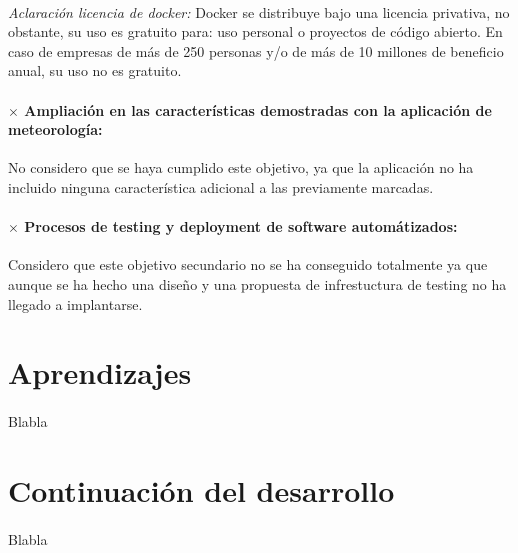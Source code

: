 \paragraph{}
\emph{Aclaración licencia de docker:} Docker se distribuye bajo una licencia privativa,
no obstante, su uso es gratuito para: uso personal o proyectos de código abierto. En
caso de empresas de más de 250 personas y/o de más de 10 millones de beneficio anual,
su uso no es gratuito.

\paragraph{$\times$ Ampliación en las características demostradas con la aplicación de
meteorología:} No considero que se haya cumplido este objetivo, ya que la aplicación
no ha incluido ninguna característica adicional a las previamente marcadas.

\paragraph{$\times$ Procesos de testing y deployment de software automátizados:} Considero
que este objetivo secundario no se ha conseguido totalmente ya que aunque se ha hecho
una diseño y una propuesta de infrestuctura de testing no ha llegado a implantarse.

\section{Aprendizajes}

\paragraph{}Blabla

\section{Continuación del desarrollo}

\paragraph{}Blabla

